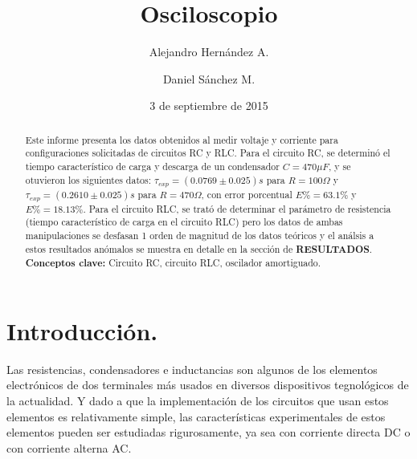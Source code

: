 \documentclass[prb,aps,twocolumn,preprintnumbers,amsmath,amssymb]{revtex4}
\begin{document}
\title{Osciloscopio}%

\author{Alejandro Hernández A.}%
\author{Daniel Sánchez M.}%
%


\date{3 de septiembre de 2015}%

\begin{abstract}
Este informe presenta los datos obtenidos al medir voltaje y corriente para configuraciones solicitadas de circuitos RC y RLC. Para el circuito RC, se determinó el tiempo característico de carga y descarga de un condensador $C = 470 \mu F$, y se otuvieron los siguientes datos: $\tau_{exp} = (0.0769 \pm 0.025) s$ para $R = 100 \Omega$ y $\tau_{exp} = (0.2610 \pm 0.025) s$ para $R = 470 \Omega$, con error porcentual $E\% = 63.1 \%$ y $E\% = 18.13 \%$. Para el circuito RLC, se trató de determinar el parámetro de resistencia (tiempo característico de carga en el circuito RLC) pero los datos de ambas manipulaciones se desfasan 1 orden de magnitud de los datos teóricos y el análsis a estos resultados anómalos se muestra en detalle en la sección de \textbf{RESULTADOS}. 
\\

\noindent \textbf{Conceptos clave:} Circuito RC, circuito RLC, oscilador amortiguado.
\end{abstract}
                             
\maketitle

\section{Introducción.}

Las resistencias, condensadores e inductancias son algunos de los elementos electrónicos de dos terminales más usados en diversos dispositivos tegnológicos de la actualidad. Y dado a que la implementación de los circuitos que usan estos elementos es relativamente simple, las características experimentales de estos elementos pueden ser estudiadas rigurosamente, ya sea con corriente directa DC o con corriente alterna AC.\\
\end{document}
